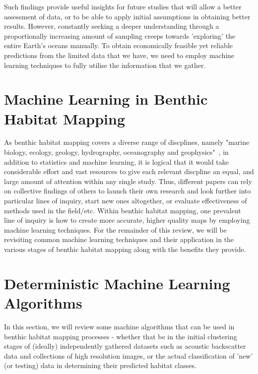             Such findings provide useful insights for future studies that will allow a better assessment of data, or to be able to apply initial assumptions in obtaining better results. However, constantly seeking a deeper understanding through a proportionally increasing amount of sampling creeps towards 'exploring' the entire Earth's oceans manually. To obtain economically feasible yet reliable predictions from the limited data that we have, we need to employ machine learning techniques to fully utilise the information that we gather.

            \section{Machine Learning in Benthic Habitat Mapping}
            As benthic habitat mapping covers a diverse range of discplines, namely "marine biology, ecology, geology, hydrography, oceanography and geophysics"~\citep{cjbrown11}, in addition to statistics and machine learning, it is logical that it would take considerable effort and vast resources to give each relevant discpline an equal, and large amount of attention within any single study. Thus, different papers can rely on collective findings of others to launch their own research and look further into particular lines of inquiry, start new ones altogether, or evaluate effectiveness of methods used in the field/etc. Within benthic habitat mapping, one prevalent line of inquiry is how to create more accurate, higher quality maps by employing machine learning techniques. For the remainder of this review, we will be revisiting common machine learning techniques and their application in the various stages of benthic habitat mapping along with the benefits they provide.

            \section{Deterministic Machine Learning Algorithms}
            In this section, we will review some machine algorithms that can be used in benthic habitat mapping processes - whether that be in the initial clustering stages of (ideally) independently gathered datasets such as acoustic backscatter data and collections of high resolution images, or the actual classification of 'new' (or testing) data in determining their predicted habitat classes.


